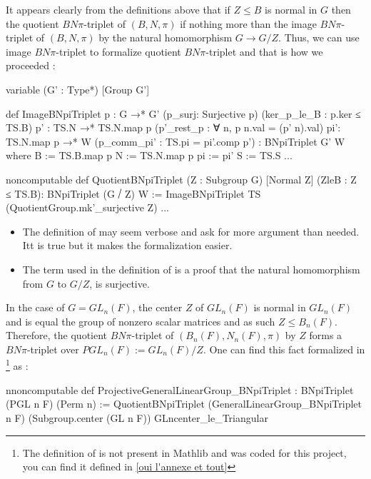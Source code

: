 It appears clearly from the definitions above that if $Z \le B$ is normal in $G$ then the quotient $BN\pi$-triplet of $\left( B,N, \pi \right)$ if nothing more than the image $BN\pi$-triplet of $\left( B,N, \pi \right)$ by the natural homomorphism $G \to G / Z$. Thus, we can use image $BN\pi$-triplet to formalize quotient $BN\pi$-triplet and that is how we proceeded :

\begin{leancode}
variable (G' : Type*) [Group G']

def ImageBNpiTriplet {p : G →* G'} (p_surj: Surjective p) (ker_p_le_B : p.ker ≤ TS.B)
    {p' : TS.N →* TS.N.map p} (p'_rest_p : ∀ n, p n.val = (p' n).val) {pi': TS.N.map p →* W}
      (p_comm_pi' : TS.pi = pi'.comp p') : BNpiTriplet G' W where
  B := TS.B.map p
  N := TS.N.map p
  pi := pi'
  S := TS.S
  ...

noncomputable
def QuotientBNpiTriplet (Z : Subgroup G) [Normal Z] (ZleB : Z ≤ TS.B): BNpiTriplet (G ⧸ Z) W :=
    ImageBNpiTriplet TS (QuotientGroup.mk'_surjective Z) ...
\end{leancode}

\begin{commentary}
    \begin{itemize}
        \item 
    The definition of  may seem verbose and ask for more argument than needed. Itt is true but it makes the formalization easier. 

\item The term   used in the definition of  is a proof that the natural homomorphism from $G$ to $G / Z$,  is surjective.
    \end{itemize}
\end{commentary}


\begin{ex}
    In the case of $G = GL_n(F)$, the center $Z$ of $GL_n(F)$ is normal in $GL_n(F)$ and is equal the group of nonzero scalar matrices and as such $Z \le B_n(F)$. Therefore, the quotient $BN\pi$-triplet of $\left( B_n(F),N_n(F), \pi \right)$ by $Z$ forms a $BN\pi$-triplet over $PGL_n\left( F \right) := GL_n(F)/Z$.
One can find this fact formalized in \footnote{The definition of  is not present in Mathlib and was coded for this project, you can find it defined in \ref{oui l'annexe et tout}} as :
\begin{leancode}
nnoncomputable
def ProjectiveGeneralLinearGroup_BNpiTriplet : BNpiTriplet (PGL n F) (Perm n) :=
  QuotientBNpiTriplet (GeneralLinearGroup_BNpiTriplet n F) (Subgroup.center (GL n F))  GLncenter_le_Triangular
\end{leancode}  
\end{ex}


